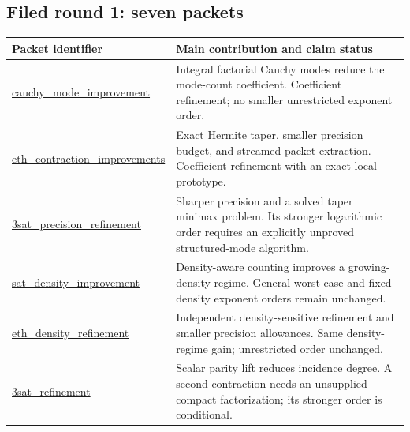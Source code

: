 \subsection*{Filed round 1: seven packets}
\begin{longtable}{>{\raggedright\arraybackslash}p{4.9cm}>{\raggedright\arraybackslash}p{10cm}}
\toprule Packet identifier & Main contribution and claim status\\
\midrule\endhead
\bottomrule\endfoot
\href{https://github.com/VladimirReshetnikov/ProveIt/tree/8e76d515063c4b9fbd8743a846b457e3a01bc039/Computability/SubexponentialSAT/Research/cauchy_mode_improvement}{\textsf{cauchy\_\allowbreak mode\_\allowbreak improvement}} & Integral factorial Cauchy modes reduce the mode-count coefficient. Coefficient refinement; no smaller unrestricted exponent order.\\[3pt]
\href{https://github.com/VladimirReshetnikov/ProveIt/tree/8e76d515063c4b9fbd8743a846b457e3a01bc039/Computability/SubexponentialSAT/Research/eth_contraction_improvements}{\textsf{eth\_\allowbreak contraction\_\allowbreak improvements}} & Exact Hermite taper, smaller precision budget, and streamed packet extraction. Coefficient refinement with an exact local prototype.\\[3pt]
\href{https://github.com/VladimirReshetnikov/ProveIt/tree/8e76d515063c4b9fbd8743a846b457e3a01bc039/Computability/SubexponentialSAT/Research/3sat_precision_refinement}{\textsf{3sat\_\allowbreak precision\_\allowbreak refinement}} & Sharper precision and a solved taper minimax problem. Its stronger logarithmic order requires an explicitly unproved structured-mode algorithm.\\[3pt]
\href{https://github.com/VladimirReshetnikov/ProveIt/tree/8e76d515063c4b9fbd8743a846b457e3a01bc039/Computability/SubexponentialSAT/Research/sat_density_improvement}{\textsf{sat\_\allowbreak density\_\allowbreak improvement}} & Density-aware counting improves a growing-density regime. General worst-case and fixed-density exponent orders remain unchanged.\\[3pt]
\href{https://github.com/VladimirReshetnikov/ProveIt/tree/8e76d515063c4b9fbd8743a846b457e3a01bc039/Computability/SubexponentialSAT/Research/eth_density_refinement}{\textsf{eth\_\allowbreak density\_\allowbreak refinement}} & Independent density-sensitive refinement and smaller precision allowances. Same density-regime gain; unrestricted order unchanged.\\[3pt]
\href{https://github.com/VladimirReshetnikov/ProveIt/tree/8e76d515063c4b9fbd8743a846b457e3a01bc039/Computability/SubexponentialSAT/Research/3sat_refinement}{\textsf{3sat\_\allowbreak refinement}} & Scalar parity lift reduces incidence degree. A second contraction needs an unsupplied compact factorization; its stronger order is conditional.\\[3pt]

\end{longtable}
